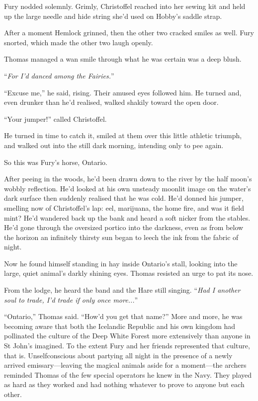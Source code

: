 \documentclass[11pt,a5paper]{article}
\begin{document}
Fury nodded solemnly. Grimly, Christoffel reached into her sewing kit and held up the large needle and hide string she'd used on Hobby's saddle strap.

After a moment Hemlock grinned, then the other two cracked smiles as well. Fury snorted, which made the other two laugh openly.

Thomas managed a wan smile through what he was certain was a deep blush.

``\emph{For I'd danced among the Fairies.}''

``Excuse me,'' he said, rising. Their amused eyes followed him. He turned and, even drunker than he'd realised, walked shakily toward the open door.

``Your jumper!'' called Christoffel.

He turned in time to catch it, smiled at them over this little athletic triumph, and walked out into the still dark morning, intending only to pee again.

\vspace{1em}

So this was Fury's horse, Ontario.

After peeing in the woods, he'd been drawn down to the river by the half moon's wobbly reflection. He'd looked at his own unsteady moonlit image on the water's dark surface then suddenly realised that he was cold. He'd donned his jumper, smelling now of Christoffel's lap: eel, marijuana, the home fire, and was it field mint? He'd wandered back up the bank and heard a soft nicker from the stables. He'd gone through the oversized portico into the darkness, even as from below the horizon an infinitely thirsty sun began to leech the ink from the fabric of night.

Now he found himself standing in hay inside Ontario's stall, looking into the large, quiet animal's darkly shining eyes. Thomas resisted an urge to pat its nose.

From the lodge, he heard the band and the Hare still singing. ``\emph{Had I another soul to trade, I'd trade if only once more...}''

``Ontario,'' Thomas said. ``How'd you get that name?'' More and more, he was becoming aware that both the Icelandic Republic and his own kingdom had pollinated the culture of the Deep White Forest more extensively than anyone in St John's imagined. To the extent Fury and her friends represented that culture, that is. Unselfconscious about partying all night in the presence of a newly arrived emissary---leaving the magical animals aside for a moment---the archers reminded Thomas of the few special operators he knew in the Navy. They played as hard as they worked and had nothing whatever to prove to anyone but each other.
\end{document}
